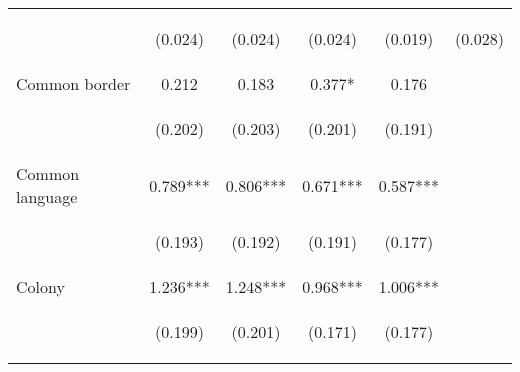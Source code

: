 \begin{center}
\begin{tabular}{lccccc}
\vspace{4pt} & \begin{footnotesize}(0.024)\end{footnotesize} & \begin{footnotesize}(0.024)\end{footnotesize} & \begin{footnotesize}(0.024)\end{footnotesize} & \begin{footnotesize}(0.019)\end{footnotesize} & \begin{footnotesize}(0.028)\end{footnotesize} \\
Common border & 0.212 & 0.183 & 0.377* & 0.176 &  \\
\vspace{4pt} & \begin{footnotesize}(0.202)\end{footnotesize} & \begin{footnotesize}(0.203)\end{footnotesize} & \begin{footnotesize}(0.201)\end{footnotesize} & \begin{footnotesize}(0.191)\end{footnotesize} & \begin{footnotesize}\end{footnotesize} \\
Common language & 0.789*** & 0.806*** & 0.671*** & 0.587*** &  \\
\vspace{4pt} & \begin{footnotesize}(0.193)\end{footnotesize} & \begin{footnotesize}(0.192)\end{footnotesize} & \begin{footnotesize}(0.191)\end{footnotesize} & \begin{footnotesize}(0.177)\end{footnotesize} & \begin{footnotesize}\end{footnotesize} \\
Colony & 1.236*** & 1.248*** & 0.968*** & 1.006*** &  \\
\vspace{4pt} & \begin{footnotesize}(0.199)\end{footnotesize} & \begin{footnotesize}(0.201)\end{footnotesize} & \begin{footnotesize}(0.171)\end{footnotesize} & \begin{footnotesize}(0.177)\end{footnotesize} & \begin{footnotesize}\end{footnotesize} \\

\end{tabular}
\end{center}
